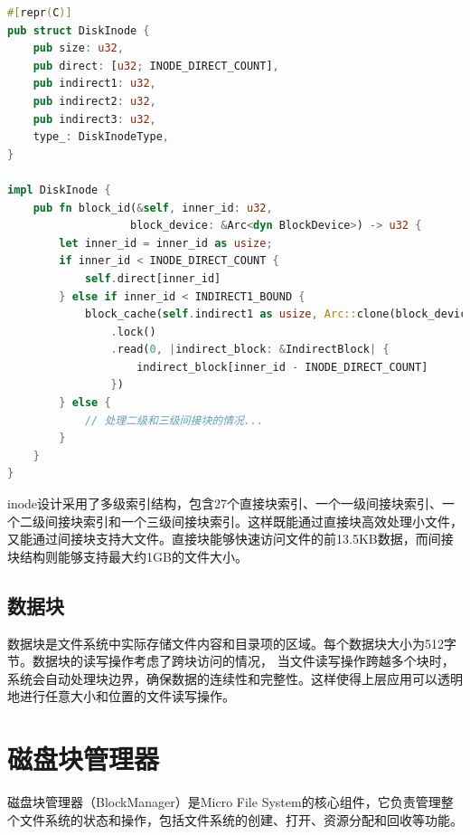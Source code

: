 \begin{lstlisting}[language=Rust]
#[repr(C)]
pub struct DiskInode {
    pub size: u32,
    pub direct: [u32; INODE_DIRECT_COUNT],
    pub indirect1: u32,
    pub indirect2: u32,
    pub indirect3: u32,
    type_: DiskInodeType,
}

impl DiskInode {
    pub fn block_id(&self, inner_id: u32, 
                   block_device: &Arc<dyn BlockDevice>) -> u32 {
        let inner_id = inner_id as usize;
        if inner_id < INODE_DIRECT_COUNT {
            self.direct[inner_id]
        } else if inner_id < INDIRECT1_BOUND {
            block_cache(self.indirect1 as usize, Arc::clone(block_device))
                .lock()
                .read(0, |indirect_block: &IndirectBlock| {
                    indirect_block[inner_id - INODE_DIRECT_COUNT]
                })
        } else {
            // 处理二级和三级间接块的情况...
        }
    }
}
\end{lstlisting}

inode设计采用了多级索引结构，包含27个直接块索引、一个一级间接块索引、一个二级间接块索引和一个三级间接块索引。这样既能通过直接块高效处理小文件，
又能通过间接块支持大文件。直接块能够快速访问文件的前13.5KB数据，而间接块结构则能够支持最大约1GB的文件大小。

\subsection{数据块}

数据块是文件系统中实际存储文件内容和目录项的区域。每个数据块大小为512字节。数据块的读写操作考虑了跨块访问的情况，
当文件读写操作跨越多个块时，系统会自动处理块边界，确保数据的连续性和完整性。这样使得上层应用可以透明地进行任意大小和位置的文件读写操作。

\section{磁盘块管理器}

磁盘块管理器（BlockManager）是Micro File System的核心组件，它负责管理整个文件系统的状态和操作，包括文件系统的创建、打开、资源分配和回收等功能。

